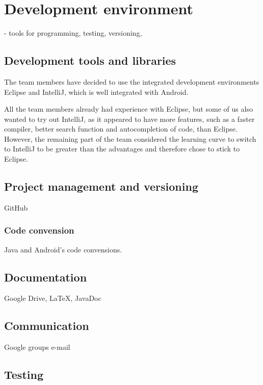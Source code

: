 \chapter{Development environment}
- tools for programming, testing, versioning, 

\section{Development tools and libraries}

The team members have decided to use the  integrated development environments Eclipse and IntelliJ, which is well integrated with Android. 

All the team members already had experience with Eclipse, but some of us also wanted to try out IntelliJ, as it appeared to have more features, such as a faster compiler, better search function and autocompletion of code, than Eclipse. However, the remaining part of the team considered the learning curve to switch to IntelliJ to be greater than the advantages and therefore chose to stick to Eclipse.

\section{Project management and versioning}
GitHub

\subsection{Code convension}
Java and Android's code convensions.

\section{Documentation}
Google Drive, LaTeX, JavaDoc

\section{Communication}
Google groups e-mail

\section{Testing}